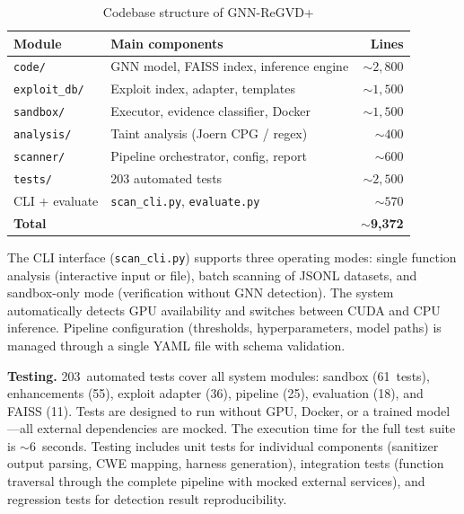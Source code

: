 \documentclass[runningheads]{llncs}
\begin{document}
\begin{table}
\centering
\caption{Codebase structure of GNN-ReGVD+}
\label{tab:codebase}
\small
\begin{tabular}{|l|l|r|}
\hline
\textbf{Module} & \textbf{Main components} & \textbf{Lines} \\
\hline
\texttt{code/} & GNN model, FAISS index, inference engine & ${\sim}2,800$ \\
\texttt{exploit\_db/} & Exploit index, adapter, templates & ${\sim}1,500$ \\
\texttt{sandbox/} & Executor, evidence classifier, Docker & ${\sim}1,500$ \\
\texttt{analysis/} & Taint analysis (Joern CPG / regex) & ${\sim}400$ \\
\texttt{scanner/} & Pipeline orchestrator, config, report & ${\sim}600$ \\
\texttt{tests/} & 203 automated tests & ${\sim}2,500$ \\
CLI + evaluate & \texttt{scan\_cli.py}, \texttt{evaluate.py} & ${\sim}570$ \\
\hline
\textbf{Total} & & ${\sim}$\textbf{9,372} \\
\hline
\end{tabular}
\end{table}

The CLI interface (\texttt{scan\_cli.py}) supports three operating modes: single function analysis (interactive input or file), batch scanning of JSONL datasets, and sandbox-only mode (verification without GNN detection). The system automatically detects GPU availability and switches between CUDA and CPU inference. Pipeline configuration (thresholds, hyperparameters, model paths) is managed through a single YAML file with schema validation.

\textbf{Testing.} 203~automated tests cover all system modules: sandbox (61~tests), enhancements (55), exploit adapter (36), pipeline (25), evaluation (18), and FAISS (11). Tests are designed to run without GPU, Docker, or a trained model---all external dependencies are mocked. The execution time for the full test suite is ${\sim}6$~seconds. Testing includes unit tests for individual components (sanitizer output parsing, CWE mapping, harness generation), integration tests (function traversal through the complete pipeline with mocked external services), and regression tests for detection result reproducibility.


\end{document}
